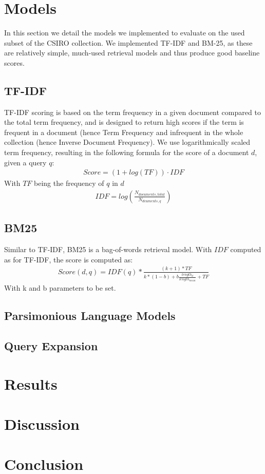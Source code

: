 \documentclass{article}
\begin{document}
\section*{Models}
In this section we detail the models we implemented to evaluate on the used subset of the CSIRO collection. We implemented TF-IDF and BM-25, as these are relatively simple, much-used retrieval models and thus produce good baseline scores.
\subsection*{TF-IDF}
TF-IDF scoring is based on the term frequency in a given document compared to the total term frequency, and is designed to return high scores if the term is frequent in a document (hence Term Frequency and infrequent in the whole collection (hence Inverse Document Frequency). We use logarithmically scaled term frequency, resulting in the following formula for the score of a document $d$, given a query $q$:
\begin{align*}
Score = (1+log(TF))\cdot IDF
\end{align*}
With $TF$ being the frequency of $q$ in $d$
\begin{align*}
IDF = log(\frac{N_{documents, total}}{N_{dcuments, q}})
\end{align*}
\subsection*{BM25}
Similar to TF-IDF, BM25 is a bag-of-words retrieval model. With $IDF$ computed as for TF-IDF, the score is computed as:
\begin{align*}
Score(d,q) = IDF(q) * \frac{(k+1)*TF}{k*(1-b)+b\frac{length_d}{length_{mean}}+TF}
\end{align*}
With k and b parameters to be set.
\subsection*{Parsimonious Language Models}
\subsection*{Query Expansion}


\section*{Results}

\section*{Discussion}

\section*{Conclusion}
\end{document}
